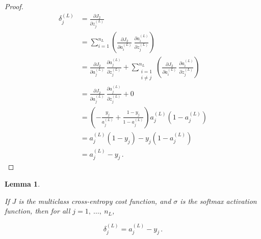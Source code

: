 \documentclass{article}[11pt]
\newtheorem{lemma}{Lemma}
\begin{document}
\begin{proof}
            $$ \begin{aligned}
            \delta^{(L)}_j &= \frac{\partial J_2}{\partial z^{(L)}_j} \\
            &= \sum_{i=1}^{n_L} \left( \frac{\partial J_2}{\partial a^{(L)}_i} \ \frac{\partial a^{(L)}_i}{\partial z^{(L)}_j} \right) \\
            &= \frac{\partial J_2}{\partial a^{(L)}_j} \ \frac{\partial a^{(L)}_j}{\partial z^{(L)}_j} + \sum_{\substack{i=1 \\ i \neq j}}^{n_L} \left( \frac{\partial J_2}{\partial a^{(L)}_i} \ \frac{\partial a^{(L)}_i}{\partial z^{(L)}_j} \right) \\
            &= \frac{\partial J_2}{\partial a^{(L)}_j} \ \frac{\partial a^{(L)}_j}{\partial z^{(L)}_j} + 0 \\
            &= \left( - \frac{y_j}{a^{(L)}_j} + \frac{1 - y_j}{1 - a^{(L)}_j} \right) a^{(L)}_j \left( 1 - a^{(L)}_j \right) \\
            &= a^{(L)}_j (1 - y_j) - y_j (1 - a^{(L)}_j) \\
            &= a^{(L)}_j - y_j \,.
            \end{aligned} $$
            
        \end{proof}

        
        \begin{lemma} \label{thm:init_softmax}
            
            If $J$ is the multiclass cross-entropy cost function, and $\sigma$ is the softmax activation function, then for all $j = 1, \ \ldots, \ n_L$,
            
            $$
            \delta^{(L)}_j = a^{(L)}_j - y_j \,.
            $$
            
        \end{lemma}
        
\end{document}
